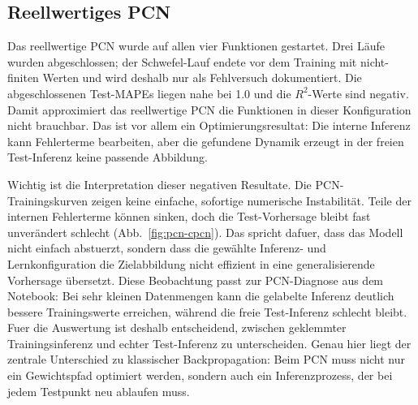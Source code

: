 \subsection{Reellwertiges PCN}

Das reellwertige PCN wurde auf allen vier Funktionen gestartet. Drei Läufe wurden abgeschlossen; der Schwefel-Lauf endete vor dem Training mit nicht-finiten Werten und wird deshalb nur als Fehlversuch dokumentiert. Die abgeschlossenen Test-MAPEs liegen nahe bei 1.0 und die $R^2$-Werte sind negativ. Damit approximiert das reellwertige PCN die Funktionen in dieser Konfiguration nicht brauchbar. Das ist vor allem ein Optimierungsresultat: Die interne Inferenz kann Fehlerterme bearbeiten, aber die gefundene Dynamik erzeugt in der freien Test-Inferenz keine passende Abbildung.

\begin{table}[H]
\centering
\footnotesize
\caption{Testresultate des reellwertigen PCN. Je Funktion liegt eine H200-Repetition vor.}
\label{tab:pcn-results}
\end{table}

Wichtig ist die Interpretation dieser negativen Resultate. Die PCN-Trainingskurven zeigen keine einfache, sofortige numerische Instabilität. Teile der internen Fehlerterme können sinken, doch die Test-Vorhersage bleibt fast unverändert schlecht (Abb.~\ref{fig:pcn-cpcn}). Das spricht dafuer, dass das Modell nicht einfach abstuerzt, sondern dass die gewählte Inferenz- und Lernkonfiguration die Zielabbildung nicht effizient in eine generalisierende Vorhersage übersetzt. Diese Beobachtung passt zur PCN-Diagnose aus dem Notebook: Bei sehr kleinen Datenmengen kann die gelabelte Inferenz deutlich bessere Trainingswerte erreichen, während die freie Test-Inferenz schlecht bleibt. Fuer die Auswertung ist deshalb entscheidend, zwischen geklemmter Trainingsinferenz und echter Test-Inferenz zu unterscheiden. Genau hier liegt der zentrale Unterschied zu klassischer Backpropagation: Beim PCN muss nicht nur ein Gewichtspfad optimiert werden, sondern auch ein Inferenzprozess, der bei jedem Testpunkt neu ablaufen muss.

